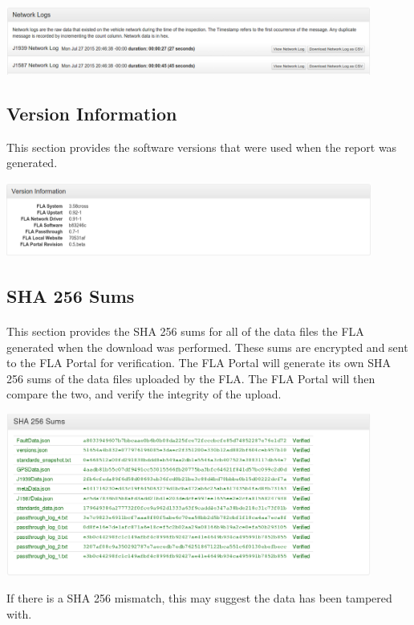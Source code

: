 \documentclass[11pt, oneside]{book}
\begin{document}
\begin{center}
\includegraphics[width=0.9\textwidth]{../media/fla_portal_screenshots/full_report/network_logs}
\end{center}



\subsection{Version Information}

This section provides the software versions that were used when the
report was generated.

\begin{center}
\includegraphics[width=0.9\textwidth]{../media/fla_portal_screenshots/full_report/version_info}
\end{center}


\subsection{SHA 256 Sums}\label{subsec:using_shas}
\paragraph{  }
This section provides the SHA 256 sums for all of the data files the
FLA generated when the download was performed. These sums are encrypted
and sent to the FLA Portal for verification. The FLA Portal will generate
its own SHA 256 sums of the data files uploaded by the FLA. The FLA
Portal will then compare the two, and verify the integrity of the
upload.

\begin{center}
\includegraphics[width=0.9\textwidth]{../media/fla_portal_screenshots/full_report/valid_shas}
\end{center}
If there is a SHA 256 mismatch, this may suggest the data has been
tampered with.
\end{document}
